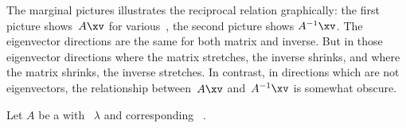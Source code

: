 \begin{example}
\begin{itemize}
The marginal pictures illustrates the reciprocal relation graphically:
the first picture shows~\(A\xv\) for various~\xv, the second picture shows \(A^{-1}\xv\).
The eigenvector directions are the same for both matrix and inverse.
But in those eigenvector directions where the matrix stretches, the inverse shrinks, and where the matrix shrinks, the inverse stretches.
In contrast, in directions which are not eigenvectors, the  relationship between~\(A\xv\) and~\(A^{-1}\xv\) is somewhat obscure.
\end{itemize}
\end{example}




\begin{theorem} \label{thm:ematpow} 
Let \(A\) be a  with ~\(\lambda\) and corresponding ~\xv.
\end{theorem}
